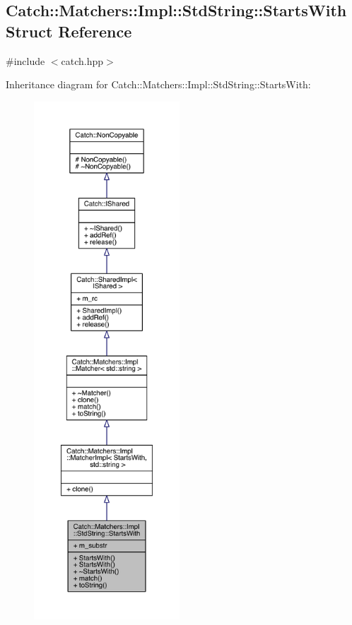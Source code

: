 \hypertarget{a00076}{}\subsection{Catch\+:\+:Matchers\+:\+:Impl\+:\+:Std\+String\+:\+:Starts\+With Struct Reference}
\label{a00076}


{\ttfamily \#include $<$catch.\+hpp$>$}



Inheritance diagram for Catch\+:\+:Matchers\+:\+:Impl\+:\+:Std\+String\+:\+:Starts\+With\+:\nopagebreak
\begin{figure}[H]
\begin{center}
\leavevmode
\includegraphics[height=550pt]{a00357}
\end{center}
\end{figure}


